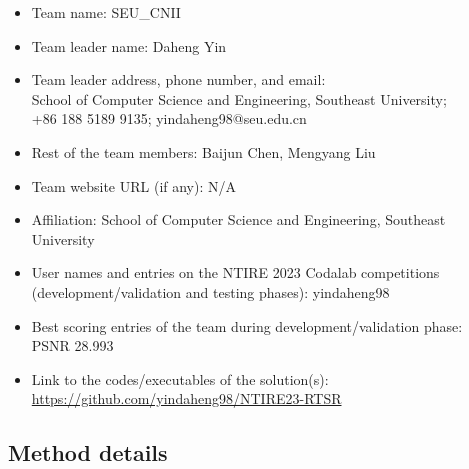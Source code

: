 \documentclass[10pt,twocolumn,letterpaper]{article}
\begin{document}
\begin{itemize}
\item Team name: SEU\_CNII
\item Team leader name: Daheng Yin
\item Team leader address, phone number, and email: \\School of Computer Science and Engineering, Southeast University; \\+86 188 5189 9135; yindaheng98@seu.edu.cn
\item Rest of the team members: Baijun Chen, Mengyang Liu
\item Team website URL (if any): N/A
\item Affiliation: School of Computer Science and Engineering, Southeast University
\item User names and entries on the NTIRE 2023 Codalab competitions (development/validation and testing phases): yindaheng98
\item Best scoring entries of the team during development/validation phase:\\PSNR 28.993
\item Link to the codes/executables of the solution(s): \url{https://github.com/yindaheng98/NTIRE23-RTSR}
\end{itemize}

\subsection{Method details}
\end{document}
